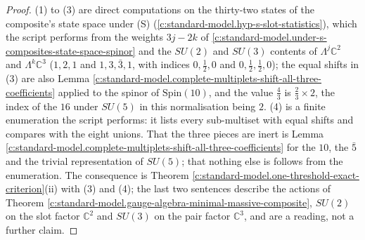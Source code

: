 \documentclass[11pt]{article}
\theoremstyle{definition}
\theoremstyle{plain}
\providecommand{\C}{}\renewcommand{\C}{\mathbb{C}}
\begin{document}
\begin{proof}
(1) to (3) are direct computations on the thirty-two states of the composite's state space under (S) (\ref{c:standard-model.hyp-s-slot-statistics}), which the script performs from the weights $3j - 2k$ of \ref{c:standard-model.under-s-composites-state-space-spinor} and the $SU(2)$ and $SU(3)$ contents of $\Lambda^{j}\C^{2}$ and $\Lambda^{k}\C^{3}$ ($1, 2, 1$ and $1, 3, \bar{3}, 1$, with indices $0, \tfrac12, 0$ and $0, \tfrac12, \tfrac12, 0$); the equal shifts in (3) are also Lemma \ref{c:standard-model.complete-multiplets-shift-all-three-coefficients} applied to the spinor of $\mathrm{Spin}(10)$, and the value $\tfrac43$ is $\tfrac23 \times 2$, the index of the $16$ under $SU(5)$ in this normalisation being $2$. (4) is a finite enumeration the script performs: it lists every sub-multiset with equal shifts and compares with the eight unions. That the three pieces are inert is Lemma \ref{c:standard-model.complete-multiplets-shift-all-three-coefficients} for the $10$, the $\bar{5}$ and the trivial representation of $SU(5)$; that nothing else is follows from the enumeration. The consequence is Theorem \ref{c:standard-model.one-threshold-exact-criterion}(ii) with (3) and (4); the last two sentences describe the actions of Theorem \ref{c:standard-model.gauge-algebra-minimal-massive-composite}, $SU(2)$ on the slot factor $\C^{2}$ and $SU(3)$ on the pair factor $\C^{3}$, and are a reading, not a further claim.

\end{proof}
\end{document}
